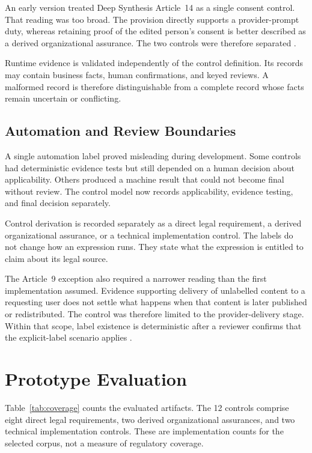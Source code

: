 \documentclass{IOS-Book-Article}
\begin{document}
An early version treated Deep Synthesis Article~14 as a single consent control. That reading was too broad. The provision directly supports a provider-prompt duty, whereas retaining proof of the edited person's consent is better described as a derived organizational assurance. The two controls were therefore separated \cite{deepSynthesisProvisions2022}.

Runtime evidence is validated independently of the control definition. Its records may contain business facts, human confirmations, and keyed reviews. A malformed record is therefore distinguishable from a complete record whose facts remain uncertain or conflicting.

\subsection{Automation and Review Boundaries}

A single automation label proved misleading during development. Some controls had deterministic evidence tests but still depended on a human decision about applicability. Others produced a machine result that could not become final without review. The control model now records applicability, evidence testing, and final decision separately.

Control derivation is recorded separately as a direct legal requirement, a derived organizational assurance, or a technical implementation control. The labels do not change how an expression runs. They state what the expression is entitled to claim about its legal source.

The Article~9 exception also required a narrower reading than the first implementation assumed. Evidence supporting delivery of unlabelled content to a requesting user does not settle what happens when that content is later published or redistributed. The control was therefore limited to the provider-delivery stage. Within that scope, label existence is deterministic after a reviewer confirms that the explicit-label scenario applies \cite{aigcLabelingMeasures2025}.

\section{Prototype Evaluation}

Table~\ref{tab:coverage} counts the evaluated artifacts. The 12 controls comprise eight direct legal requirements, two derived organizational assurances, and two technical implementation controls. These are implementation counts for the selected corpus, not a measure of regulatory coverage.
\end{document}
